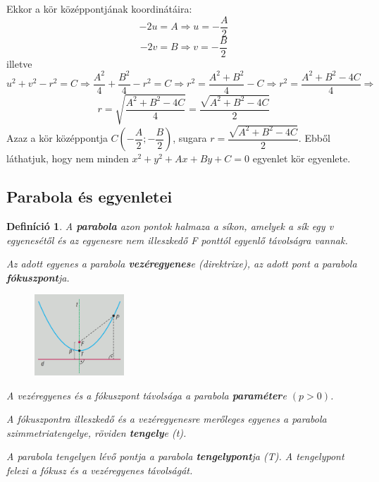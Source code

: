 \documentclass[12pt,a4paper]{article}
\newtheorem{definition}{Definíció} [section]
\begin{document}
Ekkor a kör középpontjának koordinátáira:
$$-2u=A\Rightarrow u=-\dfrac{A}{2}$$
$$-2v=B\Rightarrow v=-\dfrac{B}{2}$$
illetve
$$u^2+v^2-r^2=C\Rightarrow \dfrac{A^2}{4}+\dfrac{B^2}{4}-r^2=C\Rightarrow r^2=\dfrac{A^2+B^2}{4}-C\Rightarrow r^2=\dfrac{A^2+B^2-4C}{4}\Rightarrow$$
$$r=\sqrt{\dfrac{A^2+B^2-4C}{4}}=\dfrac{\sqrt{A^2+B^2-4C}}{2}$$
Azaz a kör középpontja $C\left(-\dfrac{A}{2}; -\dfrac{B}{2} \right)$, sugara $r=\dfrac{\sqrt{A^2+B^2-4C}}{2}$.  Ebből láthatjuk, hogy nem minden $x^2 + y^2 + Ax + By + C = 0$ egyenlet kör egyenlete.
\newpage
\subsection{Parabola és egyenletei}
\begin{definition}
A \textbf{parabola} azon pontok halmaza a síkon, amelyek a sík egy v egyenesétől és az egyenesre nem illeszkedő F ponttól egyenlő távolságra vannak.

Az adott egyenes a parabola \textbf{vezéregyenes}e (direktrixe), az adott pont a parabola \textbf{fókuszpont}ja.
\begin{figure}[h]
\centering
\includegraphics[width=0.3\textwidth]{parabola_def}
\end{figure}

A vezéregyenes és a fókuszpont távolsága a parabola \textbf{paraméter}e $(p > 0)$.

A fókuszpontra illeszkedő és a vezéregyenesre merőleges egyenes a parabola szimmetriatengelye, röviden \textbf{tengely}e (t).

A parabola tengelyen lévő pontja a parabola \textbf{tengelypont}ja (T). A tengelypont felezi a fókusz és a vezéregyenes távolságát.
\end{definition}
\end{document}
